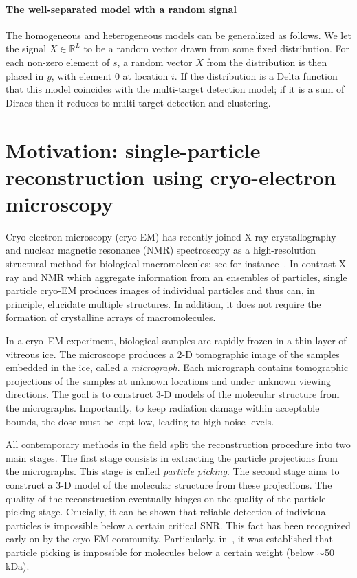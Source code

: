 \documentclass[12pt]{article}
\newcommand{\1}{\mathbf{1}}
\newcommand{\R}{\mathbb{R}}
\newcommand{\RL}{\mathbb{R}^L}
\theoremstyle{plain}
\theoremstyle{definition}
\theoremstyle{remark}
\theoremstyle{plain}
\theoremstyle{remark}
\theoremstyle{plain}
\theoremstyle{plain}
\theoremstyle{plain}
\numberwithin{equation}{section}
\begin{document}
\paragraph{The well-separated model with a random signal}
The homogeneous and heterogeneous models can be generalized as follows. 
We let the signal $X\in\RL$ to be a random vector drawn from some fixed distribution. %
For each non-zero element of $s$,  a random vector $X$ from the distribution is then placed in $y$, with element $0$ at location $i$.
If the distribution is a Delta function that this model coincides with the multi-target detection model; if it is a sum of Diracs then it reduces to multi-target detection and clustering.


\section{Motivation: single-particle reconstruction using cryo-electron microscopy}
Cryo-electron microscopy (cryo-EM)  has recently joined X-ray crystallography and nuclear magnetic resonance (NMR) spectroscopy as a high-resolution structural method for biological macromolecules; see for instance~\cite{frank2006three,kuhlbrandt2014resolution,bartesaghi20152}. 
In contrast X-ray and NMR which aggregate information from an ensembles of
particles, single particle cryo-EM produces images of individual particles and thus can, in principle, elucidate multiple  structures.
In addition, it does not require the formation of crystalline arrays of macromolecules.

In a cryo--EM experiment, biological samples are rapidly frozen in a thin layer of vitreous ice.
The microscope produces a 2-D tomographic image of the samples embedded in the ice, called a \emph{micrograph}. Each micrograph contains tomographic projections of the samples at unknown locations and under unknown viewing directions. The goal is to construct 3-D models of the molecular structure from the micrographs. 
Importantly, to keep radiation damage within acceptable bounds, the dose must be kept low, leading to high noise levels.

All contemporary methods in the field split the reconstruction procedure into two main  stages.
The first stage consists in extracting the  particle projections from the micrographs. This stage is called \emph{particle picking}. The second stage aims to construct a 3-D model of the molecular structure from these projections. The quality of the reconstruction eventually hinges on the quality of the particle picking stage.
Crucially, it can be shown that reliable detection of individual particles is impossible below a certain critical SNR. This fact has been recognized early on by the cryo-EM community. 
Particularly, in~\cite{henderson1995limitations,glaeser1999electron}, it was established that particle picking is impossible for molecules below a certain weight (below $\sim$50 kDa). 
\end{document}

